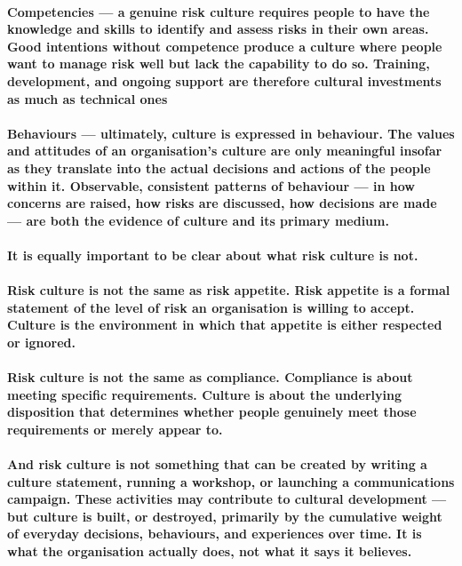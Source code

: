 \paragraph{\textbf{Competencies} — a genuine risk culture requires people to have the knowledge and skills to identify and assess risks in their own areas. Good intentions without competence produce a culture where people want to manage risk well but lack the capability to do so. Training, development, and ongoing support are therefore cultural investments as much as technical ones}
\paragraph{\textbf{Behaviours} — ultimately, culture is expressed in behaviour. The values and attitudes of an organisation's culture are only meaningful insofar as they translate into the actual decisions and actions of the people within it. Observable, consistent patterns of behaviour — in how concerns are raised, how risks are discussed, how decisions are made — are both the evidence of culture and its primary medium.}
\paragraph{It is equally important to be clear about what risk culture is not.}
\paragraph{Risk culture is not the same as risk appetite. Risk appetite is a formal statement of the level of risk an organisation is willing to accept. Culture is the environment in which that appetite is either respected or ignored.}
\paragraph{Risk culture is not the same as compliance. Compliance is about meeting specific requirements. Culture is about the underlying disposition that determines whether people genuinely meet those requirements or merely appear to.}
\paragraph{And risk culture is not something that can be created by writing a culture statement, running a workshop, or launching a communications campaign. These activities may contribute to cultural development — but culture is built, or destroyed, primarily by the cumulative weight of everyday decisions, behaviours, and experiences over time. It is what the organisation actually does, not what it says it believes.}

